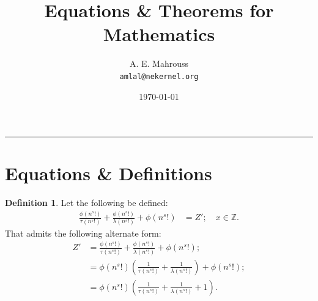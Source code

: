 \documentclass[10pt]{article}
\title{%
  \vspace{-1.5em}%
  \large\textbf{Equations \& Theorems for Mathematics}%
}
\author{A. E. Mahrouss\\\texttt{amlal@nekernel.org}}
\date{\today}
\theoremstyle{plain}
\theoremstyle{definition}
\newtheorem{definition}[theorem]{Definition}
\theoremstyle{remark}
\begin{document}
  \maketitle
\vspace{-0.5em}
\vspace{0.8em}
\rule{\linewidth}{0.4pt}
\vspace{1em}

\section{Equations \& Definitions}

\begin{definition}
	Let the following be defined:
	\begin{align*}
		\frac{\phi(n^{s}!)}{\tau(n^{s}!)} + \frac{\phi(n^{s}!)}{\lambda(n^{s}!)} + \phi(n^{s}!) &= Z'; \quad x \in \mathbb{Z}.
	\end{align*}
	That admits the following alternate form:
	\begin{align*}
		Z' &= \frac{\phi(n^{s}!)}{\tau(n^{s}!)} + \frac{\phi(n^{s}!)}{\lambda(n^{s}!)} + \phi(n^{s}!);\\
		&= \phi(n^{s}!)(\frac{1}{\tau(n^{s}!)} + \frac{1}{\lambda(n^{s}!)}) + \phi(n^{s}!);\\
		&= \phi(n^{s}!)(\frac{1}{\tau(n^{s}!)} + \frac{1}{\lambda(n^{s}!)} + 1).
	\end{align*}
\end{definition}

\nocite{*}



\end{document}
